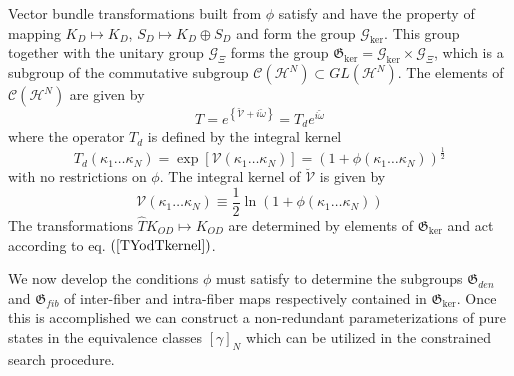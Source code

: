 \documentclass[aps,preprint]{revtex4}%
\begin{document}
Vector bundle transformations built from $\phi$ satisfy
and have the property of mapping $K_{D}\mapsto K_{D}$, $S_{D}\mapsto
K_{D}\oplus S_{D}$ and form the group $\mathcal{G}_{\ker}$. This group
together with the unitary group $\mathcal{G}_{\Xi}$ forms the group
$\mathfrak{G}_{\ker}=\mathcal{G}_{\ker}\times\mathcal{G}_{\Xi}$, which is a
subgroup of the commutative subgroup $\mathcal{C}(\mathcal{H}^{N})\subset
GL(\mathcal{H}^{N})$. The elements of $\mathcal{C}(\mathcal{H}^{N})$ are given
by
\begin{equation}
T=e^{\left\{  \mathcal{\breve{V}}+i\breve{\omega}\right\}  }=T_{d}%
e^{i\breve{\omega}}%
\end{equation}
where the operator $T_{d}$ is defined by the integral kernel
\begin{equation}
T_{d}(\kappa_{1}\ldots\kappa_{N})=\exp[\mathcal{V}(\kappa_{1}\ldots\kappa
_{N})]=(1+\phi(\kappa_{1}\ldots\kappa_{N}))^{\frac{1}{2}}%
\end{equation}
with no restrictions on $\phi$. The integral kernel of $\mathcal{\breve{V}}$
is given by
\begin{equation}
\mathcal{V}(\kappa_{1}\ldots\kappa_{N})\equiv\frac{1}{2}\ln(1+\phi(\kappa
_{1}\ldots\kappa_{N})) \label{Vhalfln}%
\end{equation}
The transformations $\hat{T}K_{OD}\mapsto K_{OD}$ are determined by elements
of $\mathfrak{G}_{\ker}$ and act according to eq. $\left(  \ref{TYodTkernel}%
\right)  $.

We now develop the conditions $\phi$ must satisfy to determine the subgroups
$\mathfrak{G}_{den}$ and $\mathfrak{G}_{fib}$ of inter-fiber and intra-fiber
maps respectively contained in $\mathfrak{G}_{\ker}$. Once this is
accomplished we can construct a non-redundant parameterizations of pure states
in the equivalence classes $\left[  \gamma\right]  _{N}$ which can be utilized
in the constrained search procedure.
\end{document}

